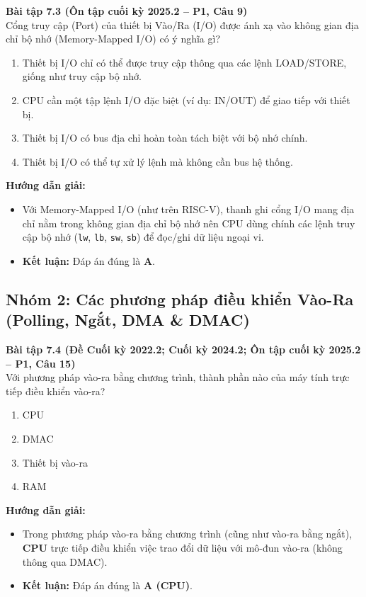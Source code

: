 \textbf{Bài tập 7.3 (Ôn tập cuối kỳ 2025.2 -- P1, Câu 9)}\\
Cổng truy cập (Port) của thiết bị Vào/Ra (I/O) được ánh xạ vào không gian địa chỉ bộ nhớ (Memory-Mapped I/O) có ý nghĩa gì?
\begin{enumerate}[label=\Alph*.]
    \item Thiết bị I/O chỉ có thể được truy cập thông qua các lệnh LOAD/STORE, giống như truy cập bộ nhớ.
    \item CPU cần một tập lệnh I/O đặc biệt (ví dụ: IN/OUT) để giao tiếp với thiết bị.
    \item Thiết bị I/O có bus địa chỉ hoàn toàn tách biệt với bộ nhớ chính.
    \item Thiết bị I/O có thể tự xử lý lệnh mà không cần bus hệ thống.
\end{enumerate}
\textbf{Hướng dẫn giải:}
\begin{itemize}
    \item Với Memory-Mapped I/O (như trên RISC-V), thanh ghi cổng I/O mang địa chỉ nằm trong không gian địa chỉ bộ nhớ nên CPU dùng chính các lệnh truy cập bộ nhớ (\texttt{lw}, \texttt{lb}, \texttt{sw}, \texttt{sb}) để đọc/ghi dữ liệu ngoại vi.
    \item \textbf{Kết luận:} Đáp án đúng là \textbf{A}.
\end{itemize}

\subsection{Nhóm 2: Các phương pháp điều khiển Vào-Ra (Polling, Ngắt, DMA \& DMAC)}

\textbf{Bài tập 7.4 (Đề Cuối kỳ 2022.2; Cuối kỳ 2024.2; Ôn tập cuối kỳ 2025.2 -- P1, Câu 15)}\\
Với phương pháp vào-ra bằng chương trình, thành phần nào của máy tính trực tiếp điều khiển vào-ra?
\begin{enumerate}[label=\Alph*.]
    \item CPU
    \item DMAC
    \item Thiết bị vào-ra
    \item RAM
\end{enumerate}
\textbf{Hướng dẫn giải:}
\begin{itemize}
    \item Trong phương pháp vào-ra bằng chương trình (cũng như vào-ra bằng ngắt), \textbf{CPU} trực tiếp điều khiển việc trao đổi dữ liệu với mô-đun vào-ra (không thông qua DMAC).
    \item \textbf{Kết luận:} Đáp án đúng là \textbf{A (CPU)}.
\end{itemize}

